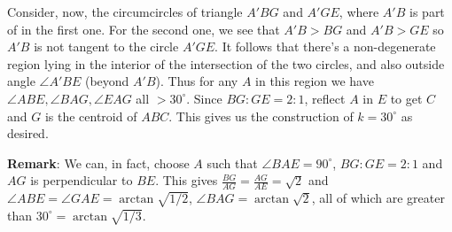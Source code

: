 \documentclass[11pt,a4paper]{article}
\begin{document}
\begin{enumerate}
	Consider, now, the circumcircles of triangle $A'BG$ and $A'GE$, where $A'B$ is part of in the first one. 
	For the second one, 
	we see that $A'B>BG$ and $A'B>GE$ so $A'B$ is not tangent to the circle $A'GE$. 
	It follows that there's a non-degenerate region lying in the interior of the intersection of the two circles, 
	and also outside angle $\angle A'BE$ (beyond $A'B$). 
	Thus for any $A$ in this region we have $\angle ABE, \angle BAG, \angle EAG$ all $>30^{\circ}$. 
	Since $BG:GE=2:1$, reflect $A$ in $E$ to get $C$ and $G$ is the centroid of $ABC$. 
	This gives us the construction of $k=30^{\circ}$ as desired. 
	
	\textbf{Remark}: 
	We can, in fact, choose $A$ such that $\angle BAE=90^{\circ}$, $BG:GE=2:1$ and $AG$ is perpendicular to $BE$. 
	This gives $\frac{BG}{AG}=\frac{AG}{AE}=\sqrt{2}$ and $\angle ABE=\angle GAE=\arctan\sqrt{1/2}$, $\angle BAG=\arctan\sqrt{2}$, 
	all of which are greater than $30^{\circ}=\arctan\sqrt{1/3}$. 
\end{enumerate}
\end{document}
